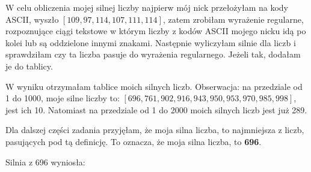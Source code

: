 \documentclass[12pt,a4paper]{article}
\begin{document}
W celu obliczenia mojej silnej liczby najpierw mój nick przełożyłam na kody ASCII, wyszło $[109, 97, 114, 107, 111, 114]$, zatem zrobiłam wyrażenie regularne, rozpoznujące ciągi tekstowe w którym liczby z kodów ASCII mojego nicku idą po kolei lub są oddzielone innymi znakami. Następnie wyliczyłam silnie dla liczb i sprawdziłam czy ta liczba pasuje do wyrażenia regularnego. Jeżeli tak, dodałam je do tablicy.

W wyniku otrzymałam tablice moich silnych liczb. Obserwacja: na przedziale od 1 do 1000, moje silne liczby to: $[696, 761, 902, 916, 943, 950, 953, 970, 985, 998]$, jest ich 10. Natomiast na przedziale od 1 do 2000 moich silnych liczb jest już 289. 

Dla dalszej części zadania przyjęłam, że moja silna liczba, to najmniejsza z liczb, pasujących pod tą definicję. To oznacza, że moja silna liczba, to \textbf{696}.


Silnia z 696 wyniosła:
\end{document}
